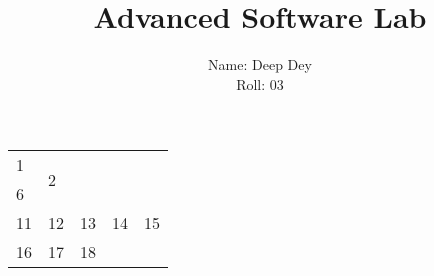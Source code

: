 \documentclass[12pt]{scrartcl}
\title{Advanced Software Lab}
\author{Name: Deep Dey\\Roll: 03}
\date{}
\begin{document}
	\maketitle
	\pagebreak
	
\begin{table}[]
\begin{tabular}{|l|l|l|l|l|}
\hline
1  & \multicolumn{4}{l|}{\multirow{2}{*}{2}} \\ \cline{1-1}
6  & \multicolumn{4}{l|}{}                   \\ \hline
11 & 12       & 13       & 14      & 15      \\ \hline
16 & 17       & \multicolumn{3}{l|}{18}      \\ \hline
\end{tabular}
\end{table}
\end{document}
